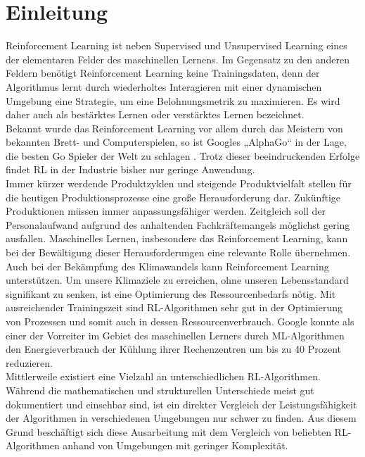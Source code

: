 \section{Einleitung}
Reinforcement Learning ist neben Supervised und Unsupervised Learning eines der elementaren Felder des maschinellen Lernens. 
Im Gegensatz zu den anderen Feldern benötigt Reinforcement Learning keine Trainingsdaten, 
denn der Algorithmus lernt durch wiederholtes Interagieren mit einer dynamischen Umgebung eine Strategie, 
um eine Belohnungsmetrik zu maximieren. Es wird daher auch als bestärktes Lernen oder verstärktes Lernen bezeichnet.\\

Bekannt wurde das Reinforcement Learning vor allem durch das Meistern von bekannten Brett- und Computerspielen, 
so ist Googles „AlphaGo“ in der Lage, die besten Go Spieler der Welt zu schlagen \cite{v7labsReinforcementLearning}. 
Trotz dieser beeindruckenden Erfolge findet RL in der Industrie bisher nur geringe Anwendung.\\  

Immer kürzer werdende Produktzyklen und steigende Produktvielfalt stellen für die heutigen Produktionsprozesse eine große Herausforderung dar.
Zukünftige Produktionen müssen immer anpassungsfähiger werden. 
Zeitgleich soll der Personalaufwand aufgrund des anhaltenden Fachkräftemangels möglichst gering ausfallen. 
Maschinelles Lernen, insbesondere das Reinforcement Learning,
kann bei der Bewältigung dieser Herausforderungen eine relevante Rolle übernehmen.\\

Auch bei der Bekämpfung des Klimawandels kann Reinforcement Learning unterstützen. 
Um unsere Klimaziele zu erreichen, ohne unseren Lebensstandard signifikant zu senken, 
ist eine Optimierung des Ressourcenbedarfs nötig. 
Mit ausreichender Trainingszeit sind RL-Algorithmen sehr gut in der Optimierung von Prozessen und 
somit auch in dessen Ressourcenverbrauch. Google konnte als einer der Vorreiter im Gebiet des maschinellen Lerners 
durch ML-Algorithmen den Energieverbrauch der Kühlung ihrer Rechenzentren um bis zu 40 Prozent reduzieren\cite{v7labsReinforcementLearning}.\\

Mittlerweile existiert eine Vielzahl an unterschiedlichen RL-Algorithmen. 
Während die mathematischen und strukturellen Unterschiede meist gut dokumentiert und einsehbar sind, 
ist ein direkter Vergleich der Leistungsfähigkeit der Algorithmen in verschiedenen Umgebungen nur schwer zu finden. 
Aus diesem Grund beschäftigt sich diese Ausarbeitung mit dem Vergleich von beliebten RL-Algorithmen anhand von Umgebungen mit geringer Komplexität.\\

